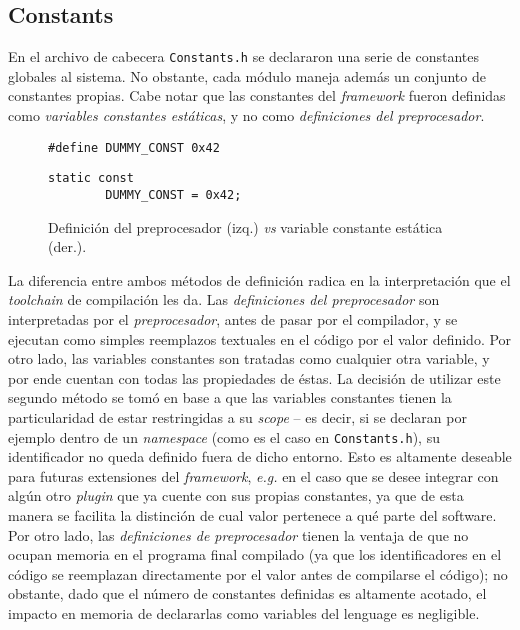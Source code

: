 \subsection{Constants}

En el archivo de cabecera \texttt{Constants.h} se declararon una serie de constantes globales al sistema. No obstante, cada módulo maneja además un conjunto de constantes propias. Cabe notar que las constantes del \emph{framework} fueron definidas como \emph{variables constantes estáticas}, y no como \emph{definiciones del preprocesador}.

\begin{figure}[h]
    \centering
    \begin{minipage}{.49\linewidth}
        \begin{lstlisting}[style=CPP, numbers=none, frame=none, backgroundcolor=\color{white}]
        #define DUMMY_CONST 0x42
        \end{lstlisting}
    \end{minipage}
    \begin{minipage}{.49\linewidth}
        \begin{lstlisting}[style=CPP, numbers=none, frame=l, backgroundcolor=\color{white}]
        static const
        DUMMY_CONST = 0x42;
        \end{lstlisting}
    \end{minipage}
    \caption[Definición del preprocesador vs. variable constante estática]{Definición del preprocesador (izq.) \emph{vs} variable constante estática (der.).}
\end{figure}

La diferencia entre ambos métodos de definición radica en la interpretación que el \emph{toolchain} de compilación les da. Las \emph{definiciones del preprocesador} son interpretadas por el \emph{preprocesador}, antes de pasar por el compilador, y se ejecutan como simples reemplazos textuales en el código por el valor definido. Por otro lado, las variables constantes son tratadas como cualquier otra variable, y por ende cuentan con todas las propiedades de éstas. La decisión de utilizar este segundo método se tomó en base a que las variables constantes tienen la particularidad de estar restringidas a su \emph{scope} -- es decir, si se declaran por ejemplo dentro de un \emph{namespace} (como es el caso en \texttt{Constants.h}), su identificador no queda definido fuera de dicho entorno.
Esto es altamente deseable para futuras extensiones del \emph{framework}, \emph{e.g.} en el caso que se desee integrar con algún otro \emph{plugin} que ya cuente con sus propias constantes, ya que de esta manera se facilita la distinción de cual valor pertenece a qué parte del software. Por otro lado, las \emph{definiciones de preprocesador} tienen la ventaja de que no ocupan memoria en el programa final compilado (ya que los identificadores en el código se reemplazan directamente por el valor antes de compilarse el código); no obstante, dado que el número de constantes definidas es altamente acotado, el impacto en memoria de declararlas como variables del lenguage es negligible.

